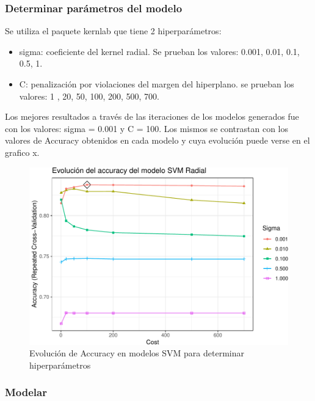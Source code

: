 \subsubsection{Determinar parámetros del modelo}
Se utiliza el paquete kernlab que tiene 2 hiperparámetros:

\begin{itemize}
	\item
	sigma: coeficiente del kernel radial. Se prueban los valores: 0.001,
	0.01, 0.1, 0.5, 1.
	\item
	C: penalización por violaciones del margen del hiperplano. se prueban
	los valores: 1 , 20, 50, 100, 200, 500, 700.
\end{itemize}

Los mejores resultados a través de las iteraciones de los modelos
generados fue con los valores: sigma = 0.001 y C = 100. Los mismos se
contrastan con los valores de Accuracy obtenidos en cada modelo y cuya
evolución puede verse en el grafico x.



\begin{figure}[!htb]
	\centering
	\includegraphics{imagenes/modelos_varios/unnamed-chunk-32-1.pdf}
	\caption{Evolución de Accuracy en modelos SVM para determinar hiperparámetros}
	\label{fig:svm_hiperparam}
\end{figure}



\subsubsection{Modelar}

